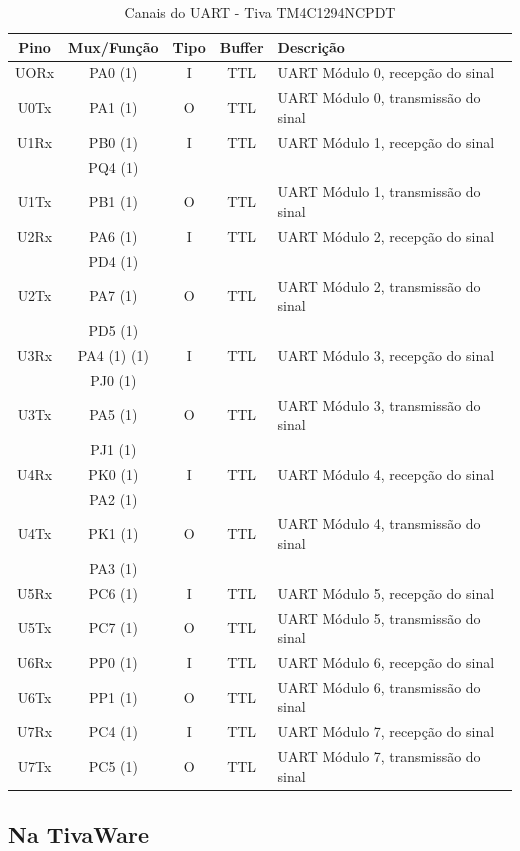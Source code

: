 \begin{table}[H]
	\centering
	\caption{Canais do UART - Tiva TM4C1294NCPDT \cite{DATASHEET_TIVA} }
	\label{tab:CanaisUART}
	\begin{tabular}{|c|c|c|c|l|}
		\rowcolor[HTML]{000000} 
		{\color[HTML]{FFFFFF} Pino}  & {\color[HTML]{FFFFFF} Mux/Função} & {\color[HTML]{FFFFFF} Tipo} & {\color[HTML]{FFFFFF} Buffer} & {\color[HTML]{FFFFFF} Descrição}  \\
		\hline
		UORx  & PA0 (1) & I & TTL & UART Módulo 0, recepção do sinal   \\
		\hline
		U0Tx  & PA1 (1) & O & TTL & UART Módulo 0, transmissão do sinal  \\
		\hline
		\hline
		U1Rx  & PB0 (1) & I & TTL & UART Módulo 1, recepção do sinal   \\
		      & PQ4 (1) &   &     &                                     \\
		\hline
		U1Tx  & PB1 (1) & O & TTL & UART Módulo 1, transmissão do sinal  \\
		\hline
		U2Rx  & PA6 (1) & I & TTL & UART Módulo 2, recepção do sinal   \\
		      & PD4 (1) &   &     &                                      \\
		\hline
		U2Tx  & PA7 (1) & O & TTL & UART Módulo 2, transmissão do sinal  \\
		      & PD5 (1) &   &     &                                      \\
		\hline
		U3Rx  & PA4 (1) (1) & I & TTL & UART Módulo 3, recepção do sinal   \\
	 	      & PJ0 (1) &   &     &                                      \\
		\hline
		U3Tx  & PA5 (1) & O & TTL & UART Módulo 3, transmissão do sinal  \\
	 	      & PJ1 (1) &   &     &                                      \\
		\hline
		U4Rx  & PK0 (1) & I & TTL & UART Módulo 4, recepção do sinal   \\
		      & PA2 (1) &   &     &                                      \\
		\hline
		U4Tx  & PK1 (1) & O & TTL & UART Módulo 4, transmissão do sinal  \\
		      & PA3 (1) &   &     &                                      \\
		\hline
		U5Rx  & PC6 (1) & I & TTL & UART Módulo 5, recepção do sinal\\
		\hline
		U5Tx  & PC7 (1) & O & TTL & UART Módulo 5, transmissão do sinal \\
		\hline
		U6Rx  & PP0 (1) & I & TTL & UART Módulo 6, recepção do sinal \\
		\hline
		U6Tx  & PP1 (1) & O & TTL & UART Módulo 6, transmissão do sinal\\
		\hline
		U7Rx  & PC4 (1) & I & TTL & UART Módulo 7, recepção do sinal \\
		\hline
		U7Tx  & PC5 (1) & O & TTL & UART Módulo 7, transmissão do sinal\\
		\hline
	\end{tabular}
\end{table}


\subsection{Na TivaWare}

